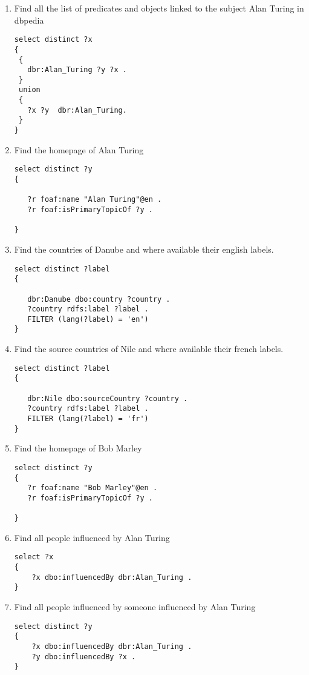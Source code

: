 \documentclass[a4paper, 12pt]{report}
\begin{document}
\begin{enumerate}
\item Find all the list of predicates and objects linked to the subject Alan Turing in dbpedia 
\begin{lstlisting}[frame=single]
select distinct ?x 
{
 {
   dbr:Alan_Turing ?y ?x .
 }
 union
 {
   ?x ?y  dbr:Alan_Turing.
 }
} 
\end{lstlisting}


\item Find the homepage of Alan Turing
\begin{lstlisting}[frame=single]
select distinct ?y
{

   ?r foaf:name "Alan Turing"@en .
   ?r foaf:isPrimaryTopicOf ?y .

} 
\end{lstlisting}

\item Find the countries of Danube and where available their english labels.
\begin{lstlisting}[frame=single]
select distinct ?label
{

   dbr:Danube dbo:country ?country .
   ?country rdfs:label ?label .
   FILTER (lang(?label) = 'en')
} 
\end{lstlisting}


\item Find the source countries of Nile and where available their french labels.
\begin{lstlisting}[frame=single]
select distinct ?label
{

   dbr:Nile dbo:sourceCountry ?country .
   ?country rdfs:label ?label .
   FILTER (lang(?label) = 'fr')
} 
\end{lstlisting}

\item Find the homepage of Bob Marley
\begin{lstlisting}[frame=single]
select distinct ?y
{
   ?r foaf:name "Bob Marley"@en .
   ?r foaf:isPrimaryTopicOf ?y .

} 
\end{lstlisting}

\item Find all people influenced by Alan Turing
\begin{lstlisting}[frame=single]
select ?x
{
    ?x dbo:influencedBy dbr:Alan_Turing .
}
\end{lstlisting}

\item Find all people influenced by someone influenced by Alan Turing
\begin{lstlisting}[frame=single]
select distinct ?y
{
    ?x dbo:influencedBy dbr:Alan_Turing .
    ?y dbo:influencedBy ?x .
}
\end{lstlisting}


\end{enumerate}
\end{document}
